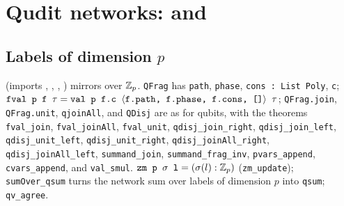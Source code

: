 \section{Qudit networks: \texorpdfstring{}{PathSumQuditNet} and \texorpdfstring{}{PathSumQuditDigits}}\label{sec:lean-pathsum-qnet}

\subsection{Labels of dimension \texorpdfstring{$p$}{p}}

 (imports , , ,
) mirrors  over $\mathbb{Z}_{p}$.
\textnormal{\texttt{QFrag}} has \textnormal{\texttt{path}}, \textnormal{\texttt{phase}}, \textnormal{\texttt{cons : List Poly}}, \textnormal{\texttt{c}};
$\textnormal{\texttt{fval p f \ensuremath{\tau}}} = \textnormal{\texttt{val p f.\allowbreak{}c \ensuremath{\langle}f.\allowbreak{}path,\allowbreak{} f.\allowbreak{}phase,\allowbreak{} f.\allowbreak{}cons,\allowbreak{} []\ensuremath{\rangle} \ensuremath{\tau}}}$; \textnormal{\texttt{QFrag.\allowbreak{}join}},
\textnormal{\texttt{QFrag.\allowbreak{}unit}}, \textnormal{\texttt{qjoinAll}}, and \textnormal{\texttt{QDisj}} are as for qubits, with the theorems
\textnormal{\texttt{fval\_\allowbreak{}join}}, \textnormal{\texttt{fval\_\allowbreak{}joinAll}}, \textnormal{\texttt{fval\_\allowbreak{}unit}}, \textnormal{\texttt{qdisj\_\allowbreak{}join\_\allowbreak{}right}},
\textnormal{\texttt{qdisj\_\allowbreak{}join\_\allowbreak{}left}}, \textnormal{\texttt{qdisj\_\allowbreak{}unit\_\allowbreak{}left}}, \textnormal{\texttt{qdisj\_\allowbreak{}unit\_\allowbreak{}right}},
\textnormal{\texttt{qdisj\_\allowbreak{}joinAll\_\allowbreak{}right}}, \textnormal{\texttt{qdisj\_\allowbreak{}joinAll\_\allowbreak{}left}}, \textnormal{\texttt{summand\_\allowbreak{}join}},
\textnormal{\texttt{summand\_\allowbreak{}frag\_\allowbreak{}inv}}, \textnormal{\texttt{pvars\_\allowbreak{}append}}, \textnormal{\texttt{cvars\_\allowbreak{}append}}, and \textnormal{\texttt{val\_\allowbreak{}smul}}.
$\textnormal{\texttt{zm p \ensuremath{\sigma} l}} = (\sigma(l):\mathbb{Z}_{p})$ (\textnormal{\texttt{zm\_\allowbreak{}update}}); \textnormal{\texttt{sumOver\_\allowbreak{}qsum}} turns the network sum
over labels of dimension $p$ into \textnormal{\texttt{qsum}}; \textnormal{\texttt{qv\_\allowbreak{}agree}}.

